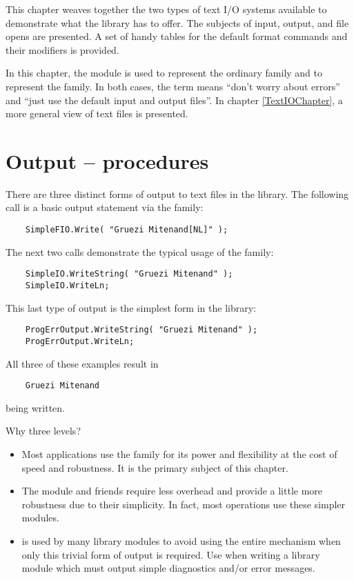 This chapter weaves together the two types of text I/O systems available
to demonstrate what the library has to offer.  
The subjects of input, output, and file opens are presented.
A set of handy tables for the default format
commands and their modifiers is provided.

In this chapter, the module  is used to
represent the ordinary  family and 
 to represent the 
family.  In both cases, the term  means ``don't
worry about errors'' and ``just use the default  input and
output files''.  In chapter \ref{TextIOChapter}, a more
general view of text files is presented.


\section{Output --  procedures}

There are three distinct forms of output to text files in the library.
The following call is a basic output statement via the 
family:
\begin{verbatim}
    SimpleFIO.Write( "Gruezi Mitenand[NL]" );
\end{verbatim}
The next two calls demonstrate the typical usage of the 
family:
\begin{verbatim}
    SimpleIO.WriteString( "Gruezi Mitenand" );
    SimpleIO.WriteLn;
\end{verbatim}
This last type of output is the simplest form in the library:
\begin{verbatim}
    ProgErrOutput.WriteString( "Gruezi Mitenand" );
    ProgErrOutput.WriteLn;
\end{verbatim}    
All three of these examples result in
\begin{verbatim}
    Gruezi Mitenand
\end{verbatim}
being written.

Why three levels? 

\begin{itemize}
\item
    Most applications use the  family for 
    its power and flexibility at the cost of speed and robustness.
    It is the primary subject of this chapter.
\item
    The module  and friends require less
    overhead and provide a little more robustness due to their simplicity.
    In fact, most  operations use
    these simpler modules.
    
\item
     is used by many library modules to avoid
    using the entire  mechanism when only
    this trivial form of output is required.  Use 
    when writing a library module which must output simple diagnostics
    and/or error messages.

\end{itemize}

